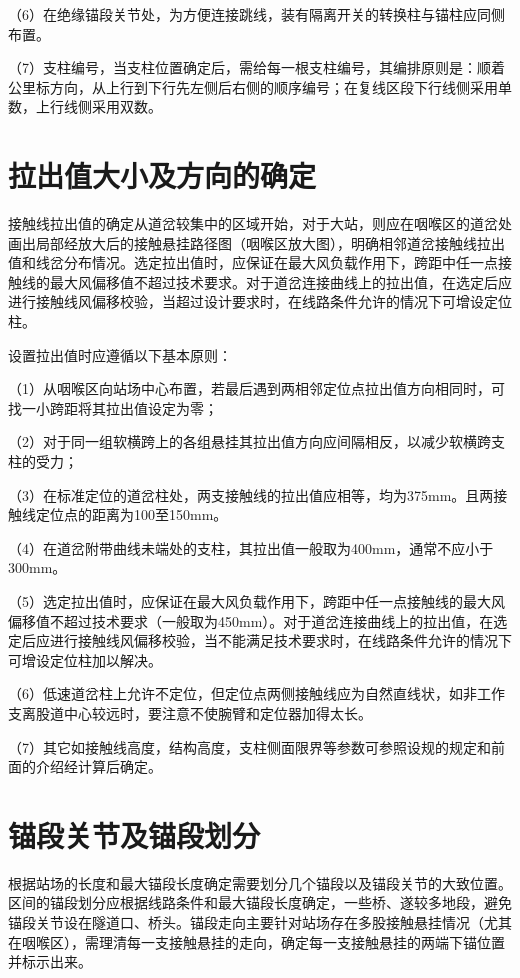 （6）在绝缘锚段关节处，为方便连接跳线，装有隔离开关的转换柱与锚柱应同侧布置。
 
（7）支柱编号，当支柱位置确定后，需给每一根支柱编号，其编排原则是：顺着公里标方向，从上行到下行先左侧后右侧的顺序编号；在复线区段下行线侧采用单数，上行线侧采用双数。

\section{拉出值大小及方向的确定}

接触线拉出值的确定从道岔较集中的区域开始，对于大站，则应在咽喉区的道岔处画出局部经放大后的接触悬挂路径图（咽喉区放大图），明确相邻道岔接触线拉出值和线岔分布情况。选定拉出值时，应保证在最大风负载作用下，跨距中任一点接触线的最大风偏移值不超过技术要求。对于道岔连接曲线上的拉出值，在选定后应进行接触线风偏移校验，当超过设计要求时，在线路条件允许的情况下可增设定位柱。

设置拉出值时应遵循以下基本原则：

（1）从咽喉区向站场中心布置，若最后遇到两相邻定位点拉出值方向相同时，可找一小跨距将其拉出值设定为零；

（2）对于同一组软横跨上的各组悬挂其拉出值方向应间隔相反，以减少软横跨支柱的受力；

（3）在标准定位的道岔柱处，两支接触线的拉出值应相等，均为375mm。且两接触线定位点的距离为100至150mm。

（4）在道岔附带曲线未端处的支柱，其拉出值一般取为400mm，通常不应小于300mm。

（5）选定拉出值时，应保证在最大风负载作用下，跨距中任一点接触线的最大风偏移值不超过技术要求（一般取为450mm）。对于道岔连接曲线上的拉出值，在选定后应进行接触线风偏移校验，当不能满足技术要求时，在线路条件允许的情况下可增设定位柱加以解决。

（6）低速道岔柱上允许不定位，但定位点两侧接触线应为自然直线状，如非工作支离股道中心较远时，要注意不使腕臂和定位器加得太长。

（7）其它如接触线高度，结构高度，支柱侧面限界等参数可参照设规的规定和前面的介绍经计算后确定。

\section{锚段关节及锚段划分}
根据站场的长度和最大锚段长度确定需要划分几个锚段以及锚段关节的大致位置。区间的锚段划分应根据线路条件和最大锚段长度确定，一些桥、遂较多地段，避免锚段关节设在隧道口、桥头。锚段走向主要针对站场存在多股接触悬挂情况（尤其在咽喉区），需理清每一支接触悬挂的走向，确定每一支接触悬挂的两端下锚位置并标示出来。

